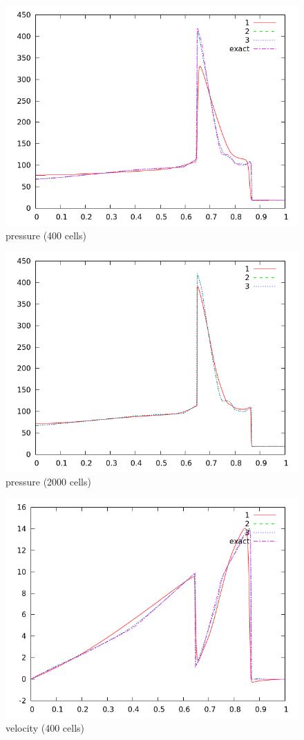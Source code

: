 \documentclass[letterpaper,12pt]{article}
\begin{document}
\begin{figure}[h]
  \begin{center}
     \includegraphics[width=.78\textwidth]{prs_T12_400.png}	
  \end{center}
  \caption{pressure (400 cells)}
\end{figure}

\begin{figure}[h]
  \begin{center}
     \includegraphics[width=.78\textwidth]{prs_T12_2000.png}	
  \end{center}
  \caption{pressure (2000 cells)}
\end{figure}

\begin{figure}[h]
  \begin{center}
     \includegraphics[width=.78\textwidth]{vel_T12_400.png}	
  \end{center}
  \caption{velocity (400 cells)}
\end{figure}
\end{document}
